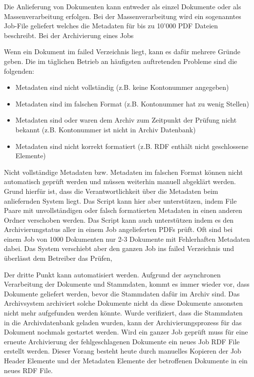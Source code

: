 \documentclass[a4paper,oneside, 12pt]{report}
\begin{document}
Die Anlieferung von Dokumenten kann entweder als einzel Dokumente oder als Massenverarbeitung erfolgen. Bei der Massenverarbeitung wird ein sogenanntes Job-File geliefert welches die Metadaten für bis zu 10'000 PDF Dateien beschreibt. Bei der Archivierung eines Jobs 

Wenn ein Dokument im failed Verzeichnis liegt, kann es dafür mehrere Gründe geben. Die im täglichen Betrieb an häufigsten auftretenden Probleme sind die folgenden:
\begin{itemize}\itemsep=0.5pt
  \item Metadaten sind nicht vollständig  (z.B. keine Kontonummer angegeben)
  \item Metadaten sind im falschen Format (z.B. Kontonummer hat zu wenig Stellen)
  \item Metadaten sind oder waren dem Archiv zum Zeitpunkt der Prüfung nicht bekannt (z.B. Kontonummer ist nicht in Archiv Datenbank)
  \item Metadaten sind nicht korrekt formatiert (z.B. RDF enthält nicht geschlossene Elemente)
\end{itemize}

Nicht vollständige Metadaten bzw. Metadaten im falschen Format können nicht automatisch geprüft werden und müssen weiterhin manuell abgeklärt werden. Grund hierfür ist, dass die Verantwortlichkeit über die Metadaten beim anliefernden System liegt. Das Script kann hier aber unterstützen, indem File Paare mit unvollständigen oder falsch formatierten Metadaten in einen anderen Ordner verschoben werden. Das Script kann auch unterstützen indem es den Archivierungstatus aller in einem Job angelieferten PDFs prüft. Oft sind bei einem Job von 1000 Dokumenten nur 2-3 Dokumente mit Fehlerhaften Metadaten dabei. Das System verschiebt aber den ganzen Job ins failed Verzeichnis und überlässt dem Betreiber das Prüfen,

Der dritte Punkt kann automatisiert werden. Aufgrund der asynchronen Verarbeitung der Dokumente und Stammdaten, kommt es immer wieder vor, dass Dokumente geliefert werden, bevor die Stammdaten dafür im Archiv sind. Das Archivsystem archiviert solche Dokumente nicht da diese Dokumente ansonsten nicht mehr aufgefunden werden könnte. Wurde verifiziert, dass die Stammdaten in die Archivdatenbank geladen wurden, kann der Archivierungsprozess für das Dokument nochmals gestartet werden. Wird ein ganzer Job geprüft muss für eine erneute Archivierung der fehlgeschlagenen Dokumente ein neues Job RDF File erstellt werden. Dieser Vorang besteht heute durch manuelles Kopieren der Job Header Elemente und der Metadaten Elemente der betroffenen Dokumente in ein neues RDF File. 
\end{document}
